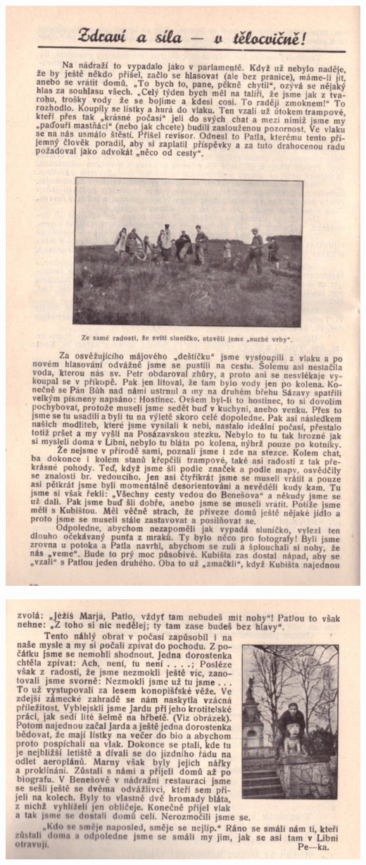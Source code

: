\documentclass[11pt]{article}
\begin{document}
\includegraphics[width=\imagewidth]{original/1931/Skener_20250315 (4).jpg}

\includegraphics[width=\imagewidth]{original/1931/Skener_20250315 (5).jpg}
\end{document}
